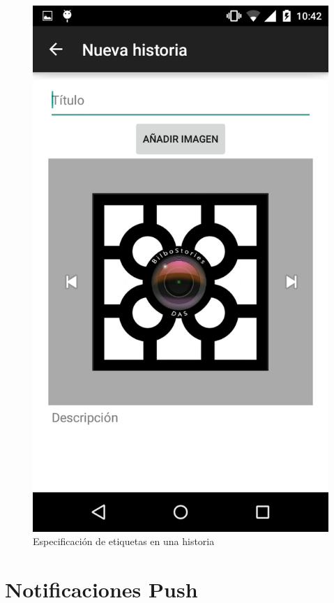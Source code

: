 \documentclass[11pt,a4paper, titlepage]{article}
\begin{document}
		\begin{figure}[hbtp]
			\centering
			\includegraphics[scale = 0.25 ]{img/13}
			\caption{Especificación de etiquetas en una historia}
			\label{p20}
		\end{figure}
		
	\FloatBarrier
	\section{Notificaciones Push}
	
\end{document}
